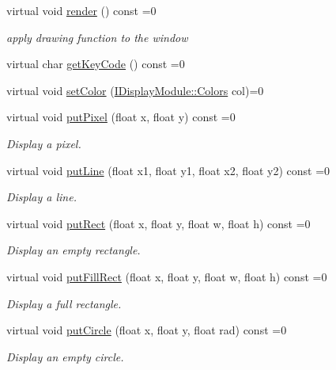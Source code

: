 \begin{DoxyCompactItemize}
virtual void \hyperlink{class_i_display_module_ae4a582ce9f12662c916c189bba12cdb7}{render} () const =0
\begin{DoxyCompactList}\small\item\em apply drawing function to the window \end{DoxyCompactList}\item 
virtual char \hyperlink{class_i_display_module_aefd588066cd4ede668497dbc4ad23b9d}{get\+Key\+Code} () const =0
\item 
virtual void \hyperlink{class_i_display_module_ad65106183d94d0019912b7c047ab0551}{set\+Color} (\hyperlink{class_i_display_module_a1130023f28ca7d10e4a04ef9b698fcbb}{I\+Display\+Module\+::\+Colors} col)=0
\item 
virtual void \hyperlink{class_i_display_module_a07807e9883aaa1b591727eae9fdd1cc8}{put\+Pixel} (float x, float y) const =0
\begin{DoxyCompactList}\small\item\em Display a pixel. \end{DoxyCompactList}\item 
virtual void \hyperlink{class_i_display_module_a2dd7bf5b2a430473d21fca846181e2fb}{put\+Line} (float x1, float y1, float x2, float y2) const =0
\begin{DoxyCompactList}\small\item\em Display a line. \end{DoxyCompactList}\item 
virtual void \hyperlink{class_i_display_module_a535b8212a9e2eaa43517c7c3a8aad0ac}{put\+Rect} (float x, float y, float w, float h) const =0
\begin{DoxyCompactList}\small\item\em Display an empty rectangle. \end{DoxyCompactList}\item 
virtual void \hyperlink{class_i_display_module_aae68e8485c4b87058a4ecdca7cc46094}{put\+Fill\+Rect} (float x, float y, float w, float h) const =0
\begin{DoxyCompactList}\small\item\em Display a full rectangle. \end{DoxyCompactList}\item 
virtual void \hyperlink{class_i_display_module_ad972f8b874b8339b1abb1d2bdbc30bc2}{put\+Circle} (float x, float y, float rad) const =0
\begin{DoxyCompactList}\small\item\em Display an empty circle. \end{DoxyCompactList}\item 

\end{DoxyCompactItemize}
